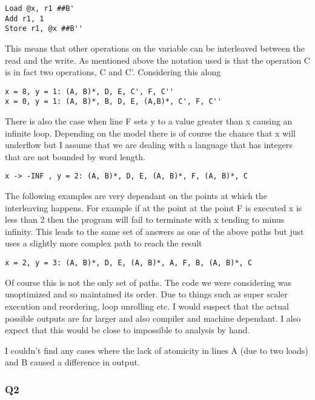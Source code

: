 \begin{verbatim}
Load @x, r1 ##B'
Add r1, 1
Store r1, @x ##B''
\end{verbatim}

This means that other operations on the variable can be interleaved
between the read and the write. As mentioned above the notation used is
that the operation C is in fact two operations, C and C'. Considering
this along

\begin{verbatim}
x = 8, y = 1: (A, B)*, D, E, C', F, C''
x = 0, y = 1: (A, B)*, B, D, E, (A,B)*, C', F, C''
\end{verbatim}

There is also the case when line F sets y to a value greater than x
causing an infinite loop. Depending on the model there is of course the
chance that x will underflow but I assume that we are dealing with a
language that has integers that are not bounded by word length.

\begin{verbatim}
x -> -INF , y = 2: (A, B)*, D, E, (A, B)*, F, (A, B)*, C
\end{verbatim}

The following examples are very dependant on the points at which the
interleaving happens. For example if at the point at the point F is
executed x is less than 2 then the program will fail to terminate with x
tending to minus infinity. This leads to the same set of answers as one
of the above paths but just uses a slightly more complex path to reach
the result

\begin{verbatim}
x = 2, y = 3: (A, B)*, D, E, (A, B)*, A, F, B, (A, B)*, C 
\end{verbatim}

Of course this is not the only set of paths. The code we were
considering was unoptimized and so maintained its order. Due to things
such as super scaler execution and reordering, loop unrolling etc. I
would suspect that the actual possible outputs are far larger and also
compiler and machine dependant. I also expect that this would be close
to impossible to analysis by hand.

I couldn't find any cases where the lack of atomicity in lines A (due to
two loads) and B caused a difference in output.

\subsubsection{Q2}

